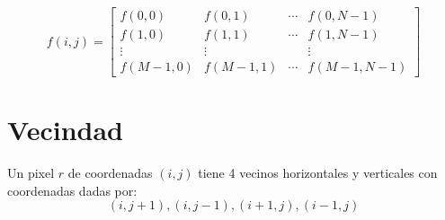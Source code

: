 \begin{equation}
\label{eq:imagenDigital}
f(i,j)=\begin{bmatrix}
f(0,0) &f(0,1)  & \cdots & f(0,N-1) \\ 
f(1,0) & f(1,1) & \cdots  & f(1,N-1)\\ 
 \vdots & \vdots & & \vdots \\ 
 f(M-1,0) & f(M-1,1)  &\cdots  & f(M-1,N-1)
\end{bmatrix}
\end{equation}




%
%
%






\section{Vecindad}
Un pixel $r$ de coordenadas $(i,j)$ tiene 4 vecinos horizontales y verticales con coordenadas dadas por:
\begin{equation}
\label{eq:vec}
(i,j+1),(i,j-1),(i+1,j),(i-1,j)
\end{equation}

